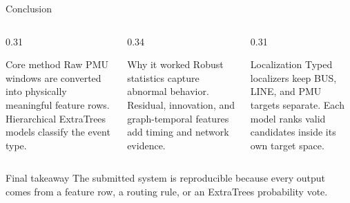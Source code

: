 ﻿\documentclass[10pt,aspectratio=169]{beamer}
\begin{document}
\begin{frame}{Conclusion}
\small
\begin{columns}[T,totalwidth=\textwidth]
\begin{column}{0.31\textwidth}
\begin{exampleblock}{Core method}
Raw PMU windows are converted into physically meaningful feature rows. Hierarchical ExtraTrees models classify the event type.
\end{exampleblock}
\end{column}
\begin{column}{0.34\textwidth}
\begin{exampleblock}{Why it worked}
Robust statistics capture abnormal behavior. Residual, innovation, and graph-temporal features add timing and network evidence.
\end{exampleblock}
\end{column}
\begin{column}{0.31\textwidth}
\begin{exampleblock}{Localization}
Typed localizers keep BUS, LINE, and PMU targets separate. Each model ranks valid candidates inside its own target space.
\end{exampleblock}
\end{column}
\end{columns}
\vspace{2mm}
\begin{alertblock}{Final takeaway}
The submitted system is reproducible because every output comes from a feature row, a routing rule, or an ExtraTrees probability vote.
\end{alertblock}
\end{frame}
\end{document}
